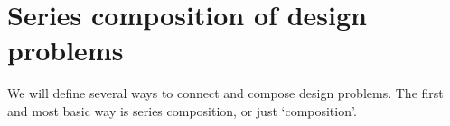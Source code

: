 %
%
%

\section{Series composition of design problems}

We will define several ways to connect and compose design problems. The first and most basic way is series composition, or just `composition'.

